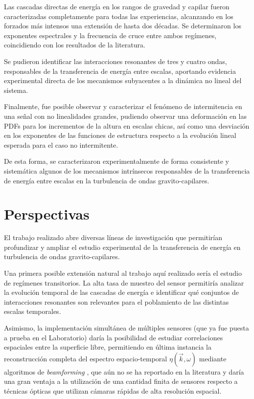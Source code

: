 Las cascadas directas de energía en los rangos de gravedad y capilar fueron caracterizadas completamente para todas las experiencias, alcanzando en los forzados más intensos una extensión de hasta dos décadas.  Se determinaron los exponentes espectrales y la frecuencia de cruce entre ambos regímenes, coincidiendo con los resultados de la literatura. %

Se pudieron identificar las interacciones resonantes de tres y cuatro ondas, responsables de la transferencia de energía entre escalas, aportando evidencia experimental directa de los mecanismos subyacentes a la dinámica no lineal del sistema. %

Finalmente, fue posible observar y caracterizar el fenómeno de intermitencia en una señal con no linealidades grandes, pudiendo observar una deformación en las PDFs para los incrementos de la altura en escalas chicas, así como una desviación en los exponentes de las funciones de estructura respecto a la evolución lineal esperada para el caso no intermitente. %

De esta forma, se  caracterizaron experimentalmente de forma consistente y sistemática algunos de los mecanismos intrínsecos responsables de la transferencia de energía entre escalas en la  turbulencia de ondas gravito-capilares. %



\section{Perspectivas}           

El trabajo realizado abre diversas líneas de investigación que permitirían profundizar y ampliar el estudio experimental de la transferencia de energía en turbulencia de ondas gravito-capilares.  

Una primera posible extensión natural al trabajo aquí realizado sería el estudio de regímenes transitorios. La alta tasa de muestro del sensor permitiría analizar la evolución temporal de las cascadas de energía e identificar qué conjuntos de interacciones resonantes son relevantes para el poblamiento de las distintas escalas temporales. 

Asimismo, la implementación simultánea de múltiples sensores (que ya fue puesta a prueba en el Laboratorio) daría la posibilidad de estudiar correlaciones espaciales entre la superficie libre, permitiendo en última instancia la reconstrucción completa del espectro espacio-temporal $\eta(\vec k, \omega)$ mediante algoritmos de \textit{beamforming} \cite{caponHighresolutionFrequencywavenumberSpectrum1969, galImprovedImplementationFk2014}, que aún no se ha reportado en la literatura y daría una gran ventaja a la utilización de una cantidad finita de sensores respecto a técnicas ópticas que utilizan cámaras rápidas de alta resolución espacial.

